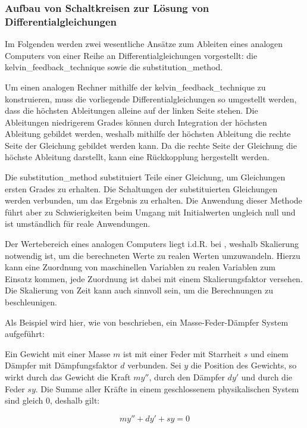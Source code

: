 \subsubsection{Aufbau von Schaltkreisen zur Lösung von Differentialgleichungen}

Im Folgenden werden zwei wesentliche Ansätze zum Ableiten eines analogen Computers von einer Reihe an Differentialgleichungen vorgestellt: die \gls{kelvin_feedback_technique} sowie die \gls{substitution_method}.

Um einen analogen Rechner mithilfe der \gls{kelvin_feedback_technique} zu konstruieren, muss die vorliegende Differentialgleichungen so umgestellt werden, dass die höchsten Ableitungen alleine auf der linken Seite stehen. Die Ableitungen niedrigerem Grades können durch Integration der höchsten Ableitung gebildet werden, weshalb mithilfe der höchsten Ableitung die rechte Seite der Gleichung gebildet werden kann. Da die rechte Seite der Gleichung die höchste Ableitung darstellt, kann eine Rückkopplung hergestellt werden. \cite[vgl. S. 153 ff.]{Ulmann2022}

Die \gls{substitution_method} substituiert Teile einer Gleichung, um Gleichungen ersten Grades zu erhalten. Die Schaltungen der substituierten Gleichungen werden verbunden, um das Ergebnis zu erhalten. Die Anwendung dieser Methode führt aber zu Schwierigkeiten beim Umgang mit Initialwerten ungleich null und ist umständlich für reale Anwendungen. \cite[vgl. S. 155 ff.]{Ulmann2022}

Der Wertebereich eines analogen Computers liegt i.d.R. bei , weshalb Skalierung notwendig ist, um die berechneten Werte zu realen Werten umzuwandeln. Hierzu kann eine Zuordnung von maschinellen Variablen zu realen Variablen zum Einsatz kommen, jede Zuordnung ist dabei mit einem Skalierungsfaktor versehen. Die Skalierung von Zeit kann auch sinnvoll sein, um die Berechnungen zu beschleunigen. \cite[vgl. S. 162 ff.]{Ulmann2022}

Als Beispiel wird hier, wie von \cite[S. 168 ff.]{Ulmann2022} beschrieben, ein Masse-Feder-Dämpfer System aufgeführt:

Ein Gewicht mit einer Masse \(m\) ist mit einer Feder mit Starrheit \(s\) und einem Dämpfer mit Dämpfungsfaktor \(d\) verbunden. Sei \(y\) die Position des Gewichts, so wirkt durch das Gewicht die Kraft \(my''\), durch den Dämpfer \(dy'\) und durch die Feder \(sy\). Die Summe aller Kräfte in einem geschlossenem physikalischen System sind gleich 0, deshalb gilt:

\[my''+dy'+sy=0\]

